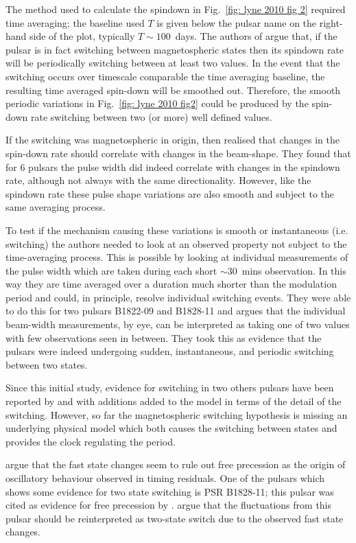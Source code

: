 The method used to calculate the spindown in Fig.~\ref{fig: lyne 2010 fig 2}
required time averaging; the baseline used $T$ is given below the pulsar name
on the right-hand side of the plot, typically $T\sim100$~days. The authors of
\citet{Lyne2010} argue that, if the pulsar is in fact switching between
magnetospheric states then its spindown rate will be periodically switching
between at least two values. In the event that the switching occurs over
timescale comparable the time averaging baseline, the resulting time averaged
spin-down will be smoothed out. Therefore, the smooth periodic variations in
Fig.~\ref{fig: lyne 2010 fig2} could be produced by the spin-down rate
switching between two (or more) well defined values.

If the switching was magnetospheric in origin, then \citet{Lyne2010} realised
that changes in the spin-down rate should correlate with changes in the
beam-shape.  They found that for 6 pulsars the pulse width did indeed correlate
with changes in the spindown rate, although not always with the same
directionality.  However, like the spindown rate these pulse shape variations
are also smooth and subject to the same averaging process.

To test if the mechanism causing these variations is smooth or instantaneous
(i.e. switching) the authors needed to look at an observed property not subject
to the time-averaging process.  This is possible by looking at individual
measurements of the pulse width which are taken during each short $\sim30$~mins
observation. In this way they are time averaged over a duration much shorter
than the modulation period and could, in principle, resolve individual
switching events. They were able to do this for two pulsars B1822-09 and
B1828-11 and argues that the individual beam-width measurements, by eye, can be
interpreted as taking one of two values with few observations seen in between.
They took this as evidence that the pulsars were indeed undergoing sudden,
instantaneous, and periodic switching between two states.

Since this initial study, evidence for switching in two others pulsars have
been reported by \citet{Perera2014} and \citet{Perera2016} with additions added
to the model in terms of the detail of the switching. However, so far the
magnetospheric switching hypothesis is missing an underlying physical model
which both causes the switching between states and provides the clock regulating
the period.

\citet{Lyne2010} argue that the fast state changes seem to rule out free
precession as the origin of oscillatory behaviour observed in timing residuals.
One of the pulsars which shows some evidence for two state switching is PSR
B1828-11; this pulsar was cited as evidence for free precession by
\citet{Akgun2006}. \citet{Lyne2010} argue that the fluctuations from this pulsar
should be reinterpreted as two-state switch due to the observed fast state
changes.

